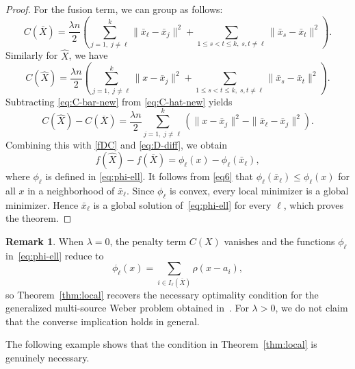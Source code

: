 \documentclass[11pt]{article}
\theoremstyle{definition}
\newtheorem{remark}[theorem]{Remark}
\newcommand{\1}{\mathbf{1}}
\def\Bar{\overline}
\begin{document}
\begin{proof}
For the fusion term, we can group as follows:
\begin{equation}\label{eq:C-bar-new}
C(\Bar{X}) = \frac{\lambda n}{2} \left( \sum_{j=1,\; j \neq \ell}^k \|\bar{x}_\ell - \bar{x}_j\|^2 + \sum_{1 \le s < t \le k,\; s,t \neq \ell} \|\bar{x}_s - \bar{x}_t\|^2 \right).
\end{equation}
Similarly for $\widehat{X}$, we have
\begin{equation}\label{eq:C-hat-new}
C(\widehat{X}) = \frac{\lambda n}{2} \left( \sum_{j=1,\; j \neq \ell}^k \|x - \bar{x}_j\|^2 + \sum_{1 \le s < t \le k,\; s,t \neq \ell} \|\bar{x}_s - \bar{x}_t\|^2 \right).
\end{equation}
Subtracting \eqref{eq:C-bar-new} from \eqref{eq:C-hat-new} yields
\begin{equation*}\label{eq:C-diff}
C(\widehat{X}) - C(\Bar{X}) = \frac{\lambda n}{2} \sum_{j=1,\; j \neq \ell}^k \left( \|x - \bar{x}_j\|^2 - \|\bar{x}_\ell - \bar{x}_j\|^2 \right).
\end{equation*}
Combining this with \eqref{fDC} and
\eqref{eq:D-diff}, we obtain
\begin{equation}
f(\widehat X) - f(\Bar X) = \phi_\ell(x) - \phi_\ell(\bar x_\ell),
\end{equation}
where $\phi_\ell$ is defined in \eqref{eq:phi-ell}. It follows from \eqref{eq6} that
$\phi_\ell(\bar x_\ell) \le \phi_\ell(x)$ for all $x$ in a neighborhood of $\bar x_\ell$. 
Since $\phi_\ell$ is convex,
every local minimizer is a global minimizer. Hence
$\bar x_\ell$ is a global solution of~\eqref{eq:phi-ell} for every $\ell$,
which proves the theorem.
\end{proof}


\begin{remark}
When $\lambda=0$, the penalty term $C(X)$ vanishes and the functions
$\phi_\ell$ in~\eqref{eq:phi-ell} reduce to
\[
\phi_\ell(x)=\sum_{i\in I_\ell(\Bar X)}\rho(x-a_i),
\]
so Theorem~\ref{thm:local} recovers the necessary optimality condition for the
generalized multi-source Weber problem obtained in~\cite[Theorem~3.11]{LNTV}.
For $\lambda>0$, we do not claim that the converse implication holds in general.
\end{remark}


The following example shows that the condition in Theorem~\ref{thm:local} is genuinely necessary.
\end{document}
